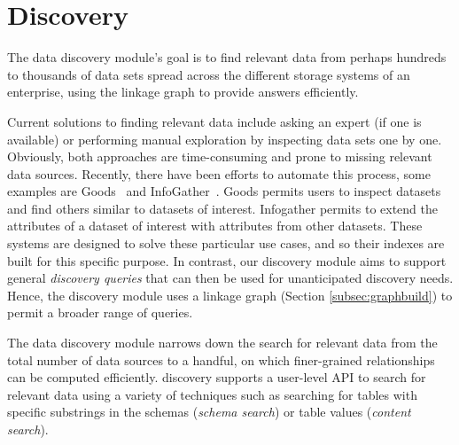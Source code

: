 \section{Discovery}
\label{sec:discovery}

The data discovery module's goal is to find relevant data from perhaps hundreds
to thousands of data sets  spread across the different storage systems of an
enterprise, using the linkage graph to provide answers efficiently.

Current solutions to finding relevant data include asking an expert (if one is
available) or  performing manual exploration by inspecting data sets one by one.
Obviously, both approaches are time-consuming and prone to missing relevant data
sources. Recently, there have been efforts to automate this process, some
examples are Goods~\cite{DBLP:conf/sigmod/HalevyKNOPRW16} and
InfoGather~\cite{DBLP:conf/sigmod/YakoutGCC12}. Goods permits users to inspect
datasets and find others similar to datasets of interest. Infogather permits to
extend the attributes of a dataset of interest with attributes from other
datasets. These systems are designed to solve these particular use cases, and so
their indexes are built for this specific purpose. In
contrast, our discovery module aims to support general \emph{discovery queries} that
can then be used for unanticipated discovery needs. Hence, the discovery module
uses a linkage graph (Section \ref{subsec:graphbuild}) to permit a broader range
of queries. 


%


The data discovery module narrows down the search for relevant data from
the total number of data sources to a handful, on which finer-grained
relationships can be computed efficiently. \dcv discovery supports a
user-level API to search for relevant data using a variety of techniques such as
searching for tables with specific substrings in the schemas ({\it schema
search}) or table values ({\it content search}). 

